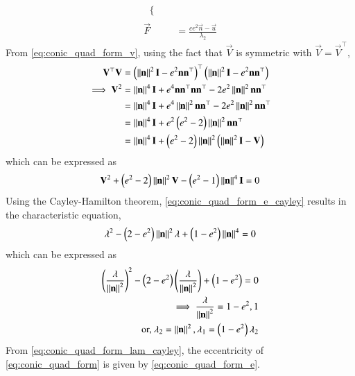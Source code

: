 \begin{enumerate}[label=\thesubsection.\arabic*.,ref=\thesubsection.\theenumi]
\begin{align}
\begin{split}
\begin{cases}
  \end{cases}
	\end{split}
  \\
  \label{eq:conic_quad_form_F} 
  \vec{F}  &= \frac{ce^2\vec{n}-\vec{u}}{\lambda_2}
\end{align}  
	\label{app:conic-parameters}
	\solution
	From \eqref{eq:conic_quad_form_v}, using the fact that $\vec{V}$ is symmetric with $\vec{V} = \vec{V}^{\top}$,
  \begin{align}
	  \mathbf{V}^{\top} \mathbf{V}&=\left(\left\lVert\mathbf{n}\right\rVert^2\mathbf{I}-e^2\mathbf{n}\mathbf{n}^{\top}\right)^{\top}
	  \left(\left\lVert\mathbf{n}\right\rVert^2\mathbf{I}-e^2\mathbf{n}\mathbf{n}^{\top}\right)
    \\
	  \implies \mathbf{V}^{2} &= \left\lVert\mathbf{n}\right\rVert^4\mathbf{I}+e^4\mathbf{n}\mathbf{n}^{\top}\mathbf{n}\mathbf{n}^{\top}
	  -2e^2\left\lVert\mathbf{n}\right\rVert^2\mathbf{n}\mathbf{n}^{\top}
    \\
	  &= \left\lVert\mathbf{n}\right\rVert^4\mathbf{I} + e^4\left\lVert\mathbf{n}\right\rVert^2\mathbf{n}\mathbf{n}^{\top}
	  - 2e^2\left\lVert\mathbf{n}\right\rVert^2\mathbf{n}\mathbf{n}^{\top}
    \\
	  &= \left\lVert\mathbf{n}\right\rVert^4\mathbf{I} + e^2\left(e^2 - 2\right)\left\lVert\mathbf{n}\right\rVert^2\mathbf{n}\mathbf{n}^{\top}
    \\
	  &= \left\lVert\mathbf{n}\right\rVert^4\mathbf{I} + \left(e^2 - 2\right)\left\lVert\mathbf{n}\right\rVert^2\left(\left\lVert\mathbf{n}\right\rVert^2\mathbf{I}- \mathbf{V}\right)
    \end{align}
%    
which can be expressed as
\begin{align}
  \mathbf{V}^{2} + \left(e^2 - 2\right)\left\lVert\mathbf{n}\right\rVert^2\mathbf{V} - \left(e^2 - 1\right)\left\lVert\mathbf{n}\right\rVert^4\mathbf{I}=0
  \label{eq:conic_quad_form_e_cayley}
\end{align}
	Using the Cayley-Hamilton theorem,
	\eqref{eq:conic_quad_form_e_cayley} results in the characteristic equation, 
\begin{align}
  \lambda^{2} - \left(2-e^2\right)\left\lVert\mathbf{n}\right\rVert^2\lambda + \left(1-e^2 \right)\left\lVert\mathbf{n}\right\rVert^4=0
\end{align}
which can be expressed as
\begin{align}
\left(\frac{\lambda}{\left\lVert\mathbf{n}\right\rVert^2}\right)^2 - \left(2-e^2 \right)\left(\frac{\lambda}{\left\lVert\mathbf{n}\right\rVert^2}\right) 
	+ \left(1-e^2 \right) = 0
	\\
	\implies \frac{\lambda}{\left\lVert\mathbf{n}\right\rVert^2} = 1-e^2, 1
  \\
	\text{or, }\lambda_2 = \left\lVert\mathbf{n}\right\rVert^2, \lambda_1 = \left(1-e^2\right)\lambda_2 
  \label{eq:conic_quad_form_lam_cayley}
\end{align}
From   \eqref{eq:conic_quad_form_lam_cayley}, the eccentricity of \eqref{eq:conic_quad_form} is given by 
\eqref{eq:conic_quad_form_e}.   

\end{enumerate}
